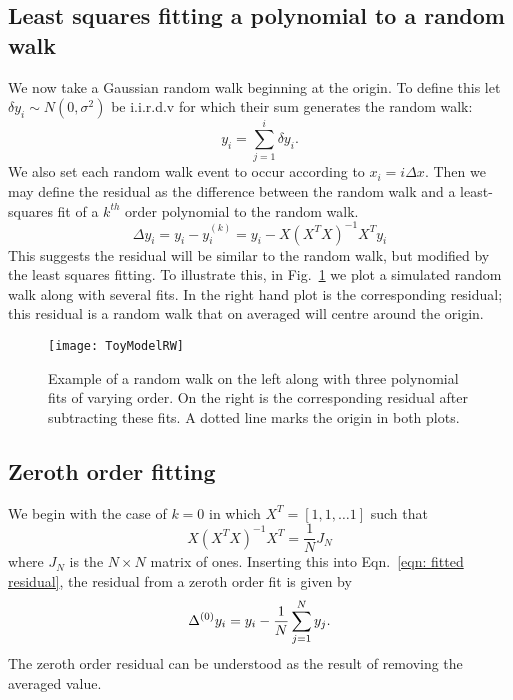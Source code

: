 \subsection{Least squares fitting a polynomial to a random walk}
We now take a Gaussian random walk beginning at the origin. To define this let
$\delta y_{i} \sim N(0, \sigma^{2})$ be i.i.r.d.v for which their sum generates
the random walk:
\begin{equation}
y_{i} = \sum_{j=1}^{i}\delta y_{i}.
\label{eqn: ToyModel RW definition}
\end{equation}
We also set each random walk event to occur according to $x_{i} = i \Delta
x$. Then we may define the
residual as the difference between the random walk and a least-squares fit of a
$k^{th}$ order polynomial to the random walk.
\begin{equation}
\Delta y_{i} = y_{i} - y_{i}^{(k)} = y_{i} - X \left(X^{T}X\right)^{-1} X^{T} y_{i}
\label{eqn: fitted residual}
\end{equation}
This suggests the residual will be similar to the random walk, but modified by
the least squares fitting.  To illustrate this, in Fig.~\ref{fig: ToyModelRW}
we plot a simulated random walk along with several fits. In the right hand plot
is the corresponding residual; this residual is a random walk that on averaged
will centre around the origin.
\begin{figure}[htb]
\centering
\texttt{[image: ToyModelRW]}
\caption{Example of a random walk on the left along with three polynomial fits
of varying order. On the right is the corresponding residual after subtracting
these fits. A dotted line marks the origin in both plots.}
\label{fig: ToyModelRW}
\end{figure}

\subsection{Zeroth order fitting}

We begin with the case of $k=0$ in which $X^{T} = [1, 1, \dots 1]$ such
that
\begin{equation}
X \left(X^{T}X\right)^{-1} X^{T} = \frac{1}{N} J_{N}
\end{equation}
where $J_{N}$ is the $N\times N$ matrix of ones.  Inserting this into
Eqn.~\eqref{eqn: fitted residual}, the residual from a zeroth order fit is given
by
\begin{equation}
\Delta^{(0)}  y_{i}= y_{i} - \frac{1}{N} \sum_{j=1}^{N}y_{j}.
\end{equation}
The zeroth order residual can be understood as the result of removing the
averaged value.

